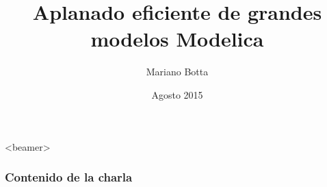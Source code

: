 \documentclass[aspectratio=169,10pt]{beamer}
\title{Aplanado eficiente de grandes modelos Modelica}
\author[M.Botta] {Mariano Botta }
\institute[UNR] %
{ FCEIA, UNR }
\date {Agosto 2015}
\begin{document}
\begin{frame}
  \titlepage
\end{frame}

\begin{frame}<beamer>
    \frametitle{Contenido de la charla}
    \tableofcontents
\end{frame}
 





\end{document}
